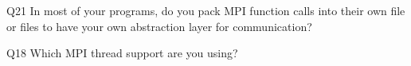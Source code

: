 \begin{description}%
\item{Q21} In most of your programs, do you pack MPI function calls into their own file or files to have your own abstraction layer for communication?%
\item{Q18} Which MPI thread support are you using?%
\end{description}%
